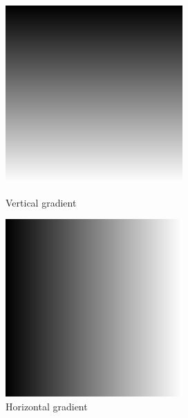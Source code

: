 \begin{figure}[h]
	\centering
	\begin{minipage}{0.45\textwidth}
		\centering
		\includegraphics[width=\linewidth]{images/source/task5/1}
		\caption{Vertical gradient}
		\label{fig:1a}
        \end{minipage}
        \hspace{0.05\textwidth}
        \begin{minipage}{0.45\textwidth}
        		\centering
		\includegraphics[width=\linewidth]{images/source/task5/2}
		\caption{Horizontal gradient}
		\label{fig:1b}
        \end{minipage}
\end{figure}

